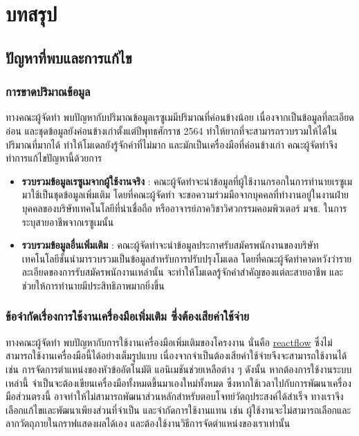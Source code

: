 \chapter{บทสรุป}

\section{ปัญหาที่พบและการแก้ไข}
\subsection{การขาดปริมาณข้อมูล}
ทางคณะผู้จัดทำ พบปัญหากับปริมาณข้อมูลเรซูเมมีปริมาณที่ค่อนข้างน้อย\cite{dataset} 
เนื่องจากเป็นข้อมูลที่ละเอียดอ่อน และชุดข้อมูลยังค่อนข้างเก่าตั้งแต่ปีพุทธศักราช 2564 ทำให้ยากที่จะสามารถรวบรวมให้ได้ในปริมาณที่มากได้ ทำให้โมเดลยังรู้จักคำที่ไม่มาก และมักเป็นเครื่องมือที่ค่อนข้างเก่า
คณะผู้จัดทำจึงทำการแก้ไขปัญหานี้ด้วยการ
\begin{itemize}
    \item \textbf{รวบรวมข้อมูลเรซูเมจากผู้ใช้งานจริง} : คณะผู้จัดทำจะนำข้อมูลที่ผู้ใช้งานกรอกในการทำนายเรซูเมมาใช้เป็นชุดข้อมูลเพิ่มเติม โดยที่คณะผู้จัดทำ
จะขอความร่วมมือจากบุคคลที่ทำงานอยู่ในงานฝ่ายบุคคลของบริษัทเทคโนโลยีที่น่าเชื่อถือ หรืออาจารย์ภาควิชาวิศวกรรมคอมพิวเตอร์ มจธ. ในการระบุสายอาชีพจากเรซูเมนั้น
    \item \textbf{รวบรวมข้อมูลอื่นเพิ่มเติม} : คณะผู้จัดทำจะนำข้อมูลประกาศรับสมัครพนักงานของบริษัทเทคโนโลยีชั้นนำมารวบรวมเป็นข้อมูลสำหรับการปรับปรุงโมเดล
โดยที่คณะผู้จัดทำคาดหวังว่ารายละเอียดของการรับสมัครพนักงานเหล่านั้น จะทำให้โมเดลรู้จักคำสำคัญของแต่ละสายอาชีพ และช่วยให้การทำนายมีประสิทธิภาพมากยิ่งขึ้น
\end{itemize}
\subsection{ข้อจำกัดเรื่องการใช้งานเครื่องมือเพิ่มเติม ซึ่งต้องเสียค่าใช้จ่าย}
\par{
    ทางคณะผู้จัดทำ พบปัญหากับการใช้งานเครื่องมือเพิ่มเติมของโครงงาน นั่นคือ \hyperref[subsec:reactflow]{reactflow} ซึ่งไม่สามารถใช้งานเครื่องมือนี้ได้อย่างเต็มรูปแบบ
    เนื่องจากจำเป็นต้องเสียค่าใช้จ่ายจึงจะสามารถใช้งานได้ เช่น การจัดการตำแหน่งของหัวข้ออัตโนมัติ แอนิเมชันช่วยเหลือต่าง ๆ ดังนั้น หากต้องการใช้งานระบบเหล่านี้ จำเป็นจะต้องเขียนเครื่องมือทั้งหมดขึ้นมาเองใหม่ทั้งหมด
    ซึ่งหากใช้เวลาไปกับการพัฒนาเครื่องมือส่วนตรงนี้ อาจทำให้ไม่สามารถพัฒนาส่วนหลักสำหรับตอบโจทย์วัตถุประสงค์ได้สำเร็จ ทางเราจึงเลือกแก้ไขและพัฒนาเพียงส่วนที่จำเป็น และจำกัดการใช้งานแทน
    เช่น ผู้ใช้งานจะไม่สามารถเลือกและลากวัตถุภายในกราฟแสดงผลได้เอง และต้องใช้งานวิธีการจัดตำแหน่งของเราเท่านั้น
}
